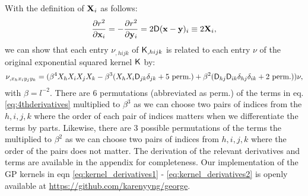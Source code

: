 With the definition of ${\bf X}_i$ as follows:
\begin{equation}
	\frac{\partial r^2}{\partial \mathbf{x}_i} = -\frac{\partial
	r^2}{\partial \mathbf{y}_i} =
	2 \mathsf{D}(\mathbf{x} - \mathbf{y})_i \equiv 2{\bf X}_i,
\end{equation}
we can show that each entry $\nu_{,hijk}$ of $\mathsf{K}_{,hijk}$ is
related to each entry $\nu$ of the original exponential squared kernel
$\mathsf{K}$ by:
\begin{equation}
\nu_{,x_h x_i y_j y_k} = (\beta^4 X_h X_i X_j X_k -
\beta^3 (X_h X_i \mathsf{D}_{jk} \delta_{jk} + 5~{\rm perm.}) + \beta^2
(\mathsf{D}_{hj} \mathsf{D}_{ik}\delta_{hj}\delta_{ik} + 2~{\rm perm.})) \nu,
\label{eq:4thderivatives}
\end{equation}
with $\beta = l^{-2}$. There are 6 permutations (abbreviated as perm.) of the terms in
eq. \ref{eq:4thderivatives}
multiplied to $\beta^3$ as we can choose two pairs of indices from the $h,i,j,k$ 
where the order of each
pair of indices matters when we differentiate the terms by parts. 
Likewise, there are 3 possible permutations of
the terms the multiplied to $\beta^2$ as we can choose two pairs of indices from
$h, i, j, k$ where the order of the pairs does not matter.
The derivation of the relevant derivatives and terms are available 
in the appendix for completeness. 
Our implementation of the GP kernels in eqn \ref{eq:kernel_derivatives1} - 
\ref{eq:kernel_derivatives2} is openly available at
\href{https://github.com/karenyyng/george}{https://github.com/karenyyng/george}.

